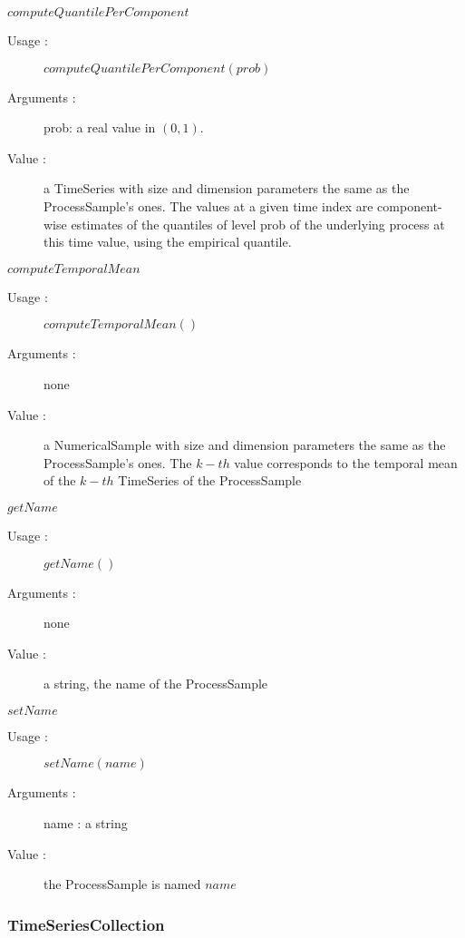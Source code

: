 \begin{description}
\begin{description}
  \item $computeQuantilePerComponent$
    \begin{description}
    \item[Usage :] $computeQuantilePerComponent(prob)$
    \item[Arguments :] prob: a real value in $(0, 1)$.
    \item[Value :] a TimeSeries with size and dimension parameters the same as the ProcessSample's ones. The values at a given time index are component-wise estimates of the quantiles of level prob of the underlying process at this time value, using the empirical quantile.
    \end{description}
    \bigskip

  \item $computeTemporalMean$
    \begin{description}
    \item[Usage :] $computeTemporalMean()$
    \item[Arguments :] none
    \item[Value :] a NumericalSample with size and dimension parameters the same as the ProcessSample's ones. 
  The $k-th$ value corresponds to the temporal mean of the $k-th$ TimeSeries of the ProcessSample 
    \end{description}
    \bigskip

  \item $getName$
    \begin{description}
    \item[Usage :] $getName()$
    \item[Arguments :] none
    \item[Value :] a string, the name of the ProcessSample
    \end{description}
    \bigskip

  \item $setName$
    \begin{description}
    \item[Usage :] $setName(name)$
    \item[Arguments :] name : a string
    \item[Value :] the ProcessSample is named $name$
    \end{description}
    \bigskip


  \end{description}

\end{description}


\newpage \subsubsection{TimeSeriesCollection}

